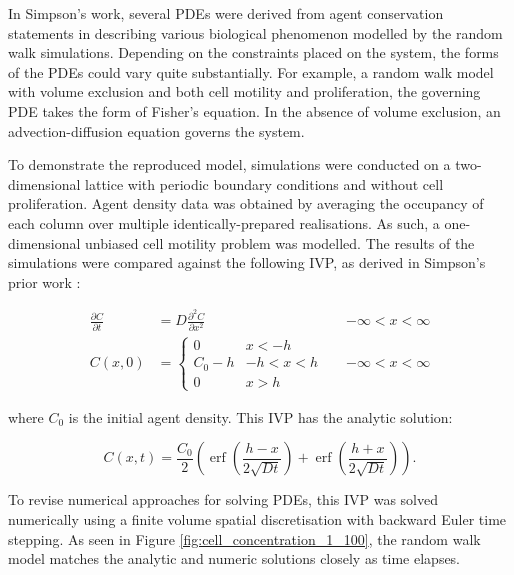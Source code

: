 \documentclass[11pt,titlepage,a4paper]{article}
\DeclareMathOperator\erf{erf}
\begin{document}
		In Simpson's work, several PDEs were derived from agent conservation statements in describing various biological phenomenon modelled by the random walk simulations. Depending on the constraints placed on the system, the forms of the PDEs could vary quite substantially. For example, a random walk model with volume exclusion and both cell motility and proliferation, the governing PDE takes the form of Fisher's equation. In the absence of volume exclusion, an advection-diffusion equation governs the system. 

		To demonstrate the reproduced model, simulations were conducted on a two-dimensional lattice with periodic boundary conditions and without cell proliferation. Agent density data was obtained by averaging the occupancy of each column over multiple identically-prepared realisations. As such, a one-dimensional  unbiased cell motility problem was modelled. The results of the simulations were compared against the following IVP, as derived in Simpson's prior work \cite{simpson2009diffusing}:

		\begin{align}
  			\frac{\partial C}{\partial t} &= D \frac{\partial^2 C}{\partial x^2} && -\infty < x < \infty \\ 
  			C(x,0) &= 
  			\begin{cases}
   				0 & x < -h \\
   				C_0 - h & -h < x < h \\
   				0 & x > h
  			\end{cases}
  			&& -\infty < x < \infty
  			\label{eq:ivp_ic}
		\end{align}

		where $C_0$ is the initial agent density. This IVP has the analytic solution:
		
		\begin{equation}
			C(x,t) = \frac{C_0}{2} \left(\erf\left(\frac{h - x}{2 \sqrt{Dt}} \right) + \erf\left(\frac{h + x}{2 \sqrt{Dt}} \right)\right).
			\label{eq:analytic_con_prolif}
		\end{equation}
		
		To revise numerical approaches for solving PDEs, this IVP was solved numerically using a finite volume spatial discretisation with backward Euler time stepping. As seen in Figure \ref{fig:cell_concentration_1_100}, the random walk model matches the analytic and numeric solutions closely as time elapses.
\end{document}
